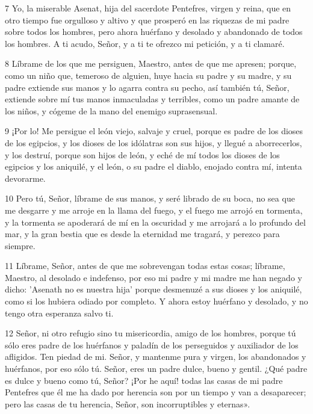 \par 7 Yo, la miserable Asenat, hija del sacerdote Pentefres, virgen y reina,
que en otro tiempo fue orgulloso y altivo y que prosperó en las riquezas de mi padre sobre todos los hombres,
pero ahora huérfano y desolado y abandonado de todos los hombres.
A ti acudo, Señor, y a ti te ofrezco mi petición,
y a ti clamaré.

\par 8 Líbrame de los que me persiguen, Maestro, antes de que me apresen;
porque, como un niño que, temeroso de alguien, huye hacia su padre y su madre,
y su padre extiende sus manos y lo agarra contra su pecho,
así también tú, Señor, extiende sobre mí tus manos inmaculadas y terribles, como un padre amante de los niños,
y cógeme de la mano del enemigo suprasensual.

\par 9 ¡Por lo! Me persigue el león viejo, salvaje y cruel,
porque es padre de los dioses de los egipcios,
y los dioses de los idólatras son sus hijos,
y llegué a aborrecerlos, y los destruí,
porque son hijos de león,
y eché de mí todos los dioses de los egipcios y los aniquilé,
y el león, o su padre el diablo, enojado contra mí, intenta devorarme.

\par 10 Pero tú, Señor, líbrame de sus manos,
y seré librado de su boca,
no sea que me desgarre y me arroje en la llama del fuego,
y el fuego me arrojó en tormenta,
y la tormenta se apoderará de mí en la oscuridad y me arrojará a lo profundo del mar,
y la gran bestia que es desde la eternidad me tragará,
y perezco para siempre.

\par 11 Líbrame, Señor, antes de que me sobrevengan todas estas cosas;
líbrame, Maestro, al desolado e indefenso,
por eso mi padre y mi madre me han negado y dicho:
'Asenath no es nuestra hija'
porque desmenuzé a sus dioses y los aniquilé,
como si los hubiera odiado por completo. Y ahora estoy huérfano y desolado, y no tengo otra esperanza salvo ti.

\par 12 Señor, ni otro refugio sino tu misericordia, amigo de los hombres,
porque tú sólo eres padre de los huérfanos y paladín de los perseguidos y auxiliador de los afligidos.
Ten piedad de mi. Señor, y mantenme pura y virgen,
los abandonados y huérfanos, por eso sólo tú.
Señor, eres un padre dulce, bueno y gentil.
¿Qué padre es dulce y bueno como tú, Señor?
¡Por he aquí! todas las casas de mi padre Pentefres
que él me ha dado por herencia son por un tiempo y van a desaparecer;
pero las casas de tu herencia, Señor, son incorruptibles y eternas».

